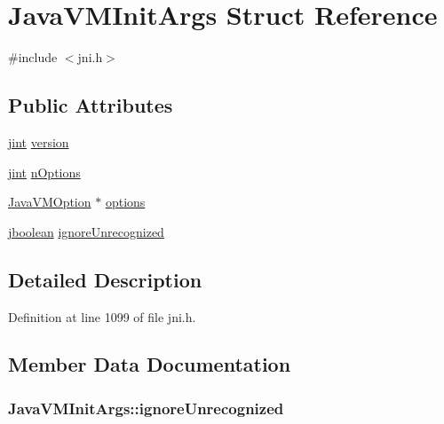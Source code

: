 \hypertarget{struct_java_v_m_init_args}{\section{Java\-V\-M\-Init\-Args Struct Reference}
\label{struct_java_v_m_init_args}
}


{\ttfamily \#include $<$jni.\-h$>$}

\subsection*{Public Attributes}
\begin{DoxyCompactItemize}
\item 
\hyperlink{jni_8h_ad6e59d976b9b5bae7a19d746bd2879c1}{jint} \hyperlink{struct_java_v_m_init_args_a90ab88849e2299bd2989287542bb214d}{version}
\item 
\hyperlink{jni_8h_ad6e59d976b9b5bae7a19d746bd2879c1}{jint} \hyperlink{struct_java_v_m_init_args_ab1714d891a0164be1a2a043e2f9f801b}{n\-Options}
\item 
\hyperlink{struct_java_v_m_option}{Java\-V\-M\-Option} $\ast$ \hyperlink{struct_java_v_m_init_args_ae72105011c3bed16180578f7ba0eb3fa}{options}
\item 
\hyperlink{jni_8h_a3e597066bbafe45e3d729fc1f4f9829f}{jboolean} \hyperlink{struct_java_v_m_init_args_a15645a37be26428bbaadf99d6237c5bc}{ignore\-Unrecognized}
\end{DoxyCompactItemize}


\subsection{Detailed Description}


Definition at line 1099 of file jni.\-h.



\subsection{Member Data Documentation}
\hypertarget{struct_java_v_m_init_args_a15645a37be26428bbaadf99d6237c5bc}{
\subsubsection[{ignore\-Unrecognized}]{ Java\-V\-M\-Init\-Args\-::ignore\-Unrecognized}}\label{struct_java_v_m_init_args_a15645a37be26428bbaadf99d6237c5bc}


